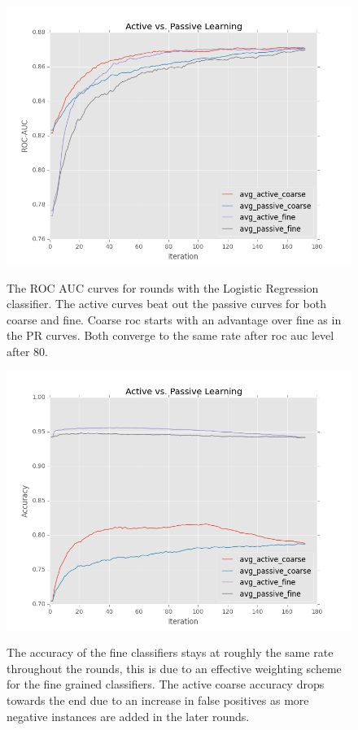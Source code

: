 \documentclass[ms]{nuthesis}
\begin{document}
\FloatBarrier
\begin{figure}[!htb]
	\centering
    \includegraphics[width=1.0\columnwidth]{fig/ActiveVsPassiveROCLR}
    \label{fig:ActiveVsPassiveROCLR}
    \caption{The ROC AUC curves for rounds with the
Logistic Regression classifier. The active curves beat out the passive
curves for both coarse and fine. Coarse roc starts with an advantage over
fine as in the PR curves. Both converge to the same rate after roc auc level after 80.}
\end{figure}
\FloatBarrier

\FloatBarrier
\begin{figure}[!htb]
	\centering
    \includegraphics[width=1.0\columnwidth]{fig/ActiveVsPassiveAccLR}
    \label{fig:ActiveVsPassiveAccLR}
    \caption{The accuracy of the fine classifiers stays at
roughly the same rate throughout the rounds, this is due to an effective
weighting scheme for the fine grained classifiers. The active coarse accuracy
drops towards the end due to an increase in false positives as more negative
instances are added in the later rounds.}
\end{figure}
\FloatBarrier
\end{document}
